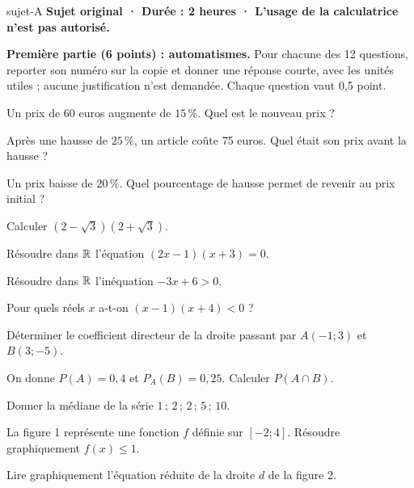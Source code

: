 \begin{blocEdition}{sujet-A}
\textbf{Sujet original · Durée : 2 heures · L’usage de la calculatrice n’est pas autorisé.}
\par\smallskip\textbf{Première partie (6 points) : automatismes.} Pour chacune des 12 questions,
reporter son numéro sur la copie et donner une réponse courte, avec les unités utiles ;
aucune justification n’est demandée. Chaque question vaut 0,5 point.
\par\vspace{2mm}\begin{questions}\item Un prix de 60 euros augmente de $15\,\%$. Quel est le nouveau prix ?
\item Après une hausse de $25\,\%$, un article coûte 75 euros. Quel était son prix avant la hausse ?
\item Un prix baisse de $20\,\%$. Quel pourcentage de hausse permet de revenir au prix initial ?
\item Calculer $(2-\sqrt3)(2+\sqrt3)$.
\item Résoudre dans $\mathbb{R}$ l’équation $(2x-1)(x+3)=0$.
\item Résoudre dans $\mathbb{R}$ l’inéquation $-3x+6>0$.
\item Pour quels réels $x$ a-t-on $(x-1)(x+4)<0$ ?
\item Déterminer le coefficient directeur de la droite passant par $A(-1;3)$ et $B(3;-5)$.
\item On donne $P(A)=0{,}4$ et $P_A(B)=0{,}25$. Calculer $P(A\cap B)$.
\item Donner la médiane de la série $1\,;\,2\,;\,2\,;\,5\,;\,10$.
\item La figure 1 représente une fonction $f$ définie sur $[-2;4]$. Résoudre graphiquement $f(x)\leq1$.
\item Lire graphiquement l’équation réduite de la droite $d$ de la figure 2.\end{questions}
\label{figedition-sujet-A-1}
\end{blocEdition}


